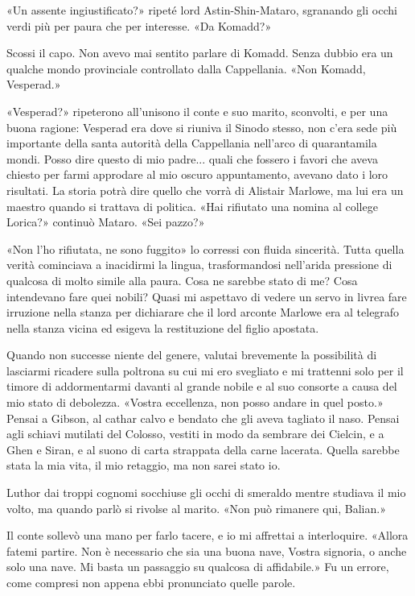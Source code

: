 «Un assente ingiustificato?» ripeté lord Astin-Shin-Mataro, sgranando
gli occhi verdi più per paura che per interesse. «Da Komadd?»

Scossi il capo. Non avevo mai sentito parlare di Komadd. Senza dubbio
era un qualche mondo provinciale controllato dalla Cappellania. «Non
Komadd, Vesperad.»

«Vesperad?» ripeterono all'unisono il conte e suo marito, sconvolti, e
per una buona ragione: Vesperad era dove si riuniva il Sinodo stesso,
non c'era sede più importante della santa autorità della Cappellania
nell'arco di quarantamila mondi. Posso dire questo di mio padre... quali
che fossero i favori che aveva chiesto per farmi approdare al mio oscuro
appuntamento, avevano dato i loro risultati. La storia potrà dire quello
che vorrà di Alistair Marlowe, ma lui era un maestro quando si trattava
di politica. «Hai rifiutato una nomina al college Lorica?» continuò
Mataro. «Sei pazzo?»

«Non l'ho rifiutata, ne sono fuggito» lo corressi con fluida sincerità.
Tutta quella verità cominciava a inacidirmi la lingua, trasformandosi
nell'arida pressione di qualcosa di molto simile alla paura. Cosa ne
sarebbe stato di me? Cosa intendevano fare quei nobili? Quasi mi
aspettavo di vedere un servo in livrea fare irruzione nella stanza per
dichiarare che il lord arconte Marlowe era al telegrafo nella stanza
vicina ed esigeva la restituzione del figlio apostata.

Quando non successe niente del genere, valutai brevemente la possibilità
di lasciarmi ricadere sulla poltrona su cui mi ero svegliato e mi
trattenni solo per il timore di addormentarmi davanti al grande nobile e
al suo consorte a causa del mio stato di debolezza. «Vostra eccellenza,
non posso andare in quel posto.» Pensai a Gibson, al cathar calvo e
bendato che gli aveva tagliato il naso. Pensai agli schiavi mutilati del
Colosso, vestiti in modo da sembrare dei Cielcin, e a Ghen e Siran, e al
suono di carta strappata della carne lacerata. Quella sarebbe stata la
mia vita, il mio retaggio, ma non sarei stato io.

Luthor dai troppi cognomi socchiuse gli occhi di smeraldo mentre
studiava il mio volto, ma quando parlò si rivolse al marito. «Non può
rimanere qui, Balian.»

Il conte sollevò una mano per farlo tacere, e io mi affrettai a
interloquire. «Allora fatemi partire. Non è necessario che sia una buona
nave, Vostra signoria, o anche solo una nave. Mi basta un passaggio su
qualcosa di affidabile.» Fu un errore, come compresi non appena ebbi
pronunciato quelle parole.


